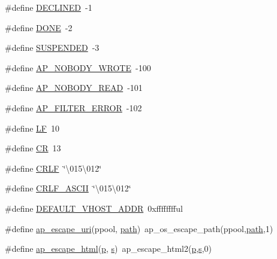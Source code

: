 \begin{DoxyCompactItemize}
\item 
\#define \hyperlink{group__APACHE__CORE__DAEMON_ga9eba11ca86461a3ae319311d64682dda}{D\+E\+C\+L\+I\+N\+ED}~-\/1
\item 
\#define \hyperlink{group__APACHE__CORE__DAEMON_gabe6b865c045f3e7c6892ef4f15ff5779}{D\+O\+NE}~-\/2
\item 
\#define \hyperlink{group__APACHE__CORE__DAEMON_gaeb2de2a76ea6728368042cf7a3fcd60c}{S\+U\+S\+P\+E\+N\+D\+ED}~-\/3
\item 
\#define \hyperlink{group__APACHE__CORE__DAEMON_gab6541339293a2dc16d92208f9656ba02}{A\+P\+\_\+\+N\+O\+B\+O\+D\+Y\+\_\+\+W\+R\+O\+TE}~-\/100
\item 
\#define \hyperlink{group__APACHE__CORE__DAEMON_gafafcc328b1e4659b888a331e302c7d43}{A\+P\+\_\+\+N\+O\+B\+O\+D\+Y\+\_\+\+R\+E\+AD}~-\/101
\item 
\#define \hyperlink{group__APACHE__CORE__DAEMON_ga571664f1af74affc2b898a892f335b82}{A\+P\+\_\+\+F\+I\+L\+T\+E\+R\+\_\+\+E\+R\+R\+OR}~-\/102
\item 
\#define \hyperlink{group__APACHE__CORE__DAEMON_gacdd2e847ca4860289abebda77d2b3c19}{LF}~10
\item 
\#define \hyperlink{group__APACHE__CORE__DAEMON_gac7dc463c440edc9cf8f6a1e316e0b55b}{CR}~13
\item 
\#define \hyperlink{group__APACHE__CORE__DAEMON_ga596f22107770abbd60ffce8338be9732}{C\+R\+LF}~\char`\"{}\textbackslash{}015\textbackslash{}012\char`\"{}
\item 
\#define \hyperlink{group__APACHE__CORE__DAEMON_ga27f3d44ac7137b1b7618bb122c125d75}{C\+R\+L\+F\+\_\+\+A\+S\+C\+II}~\char`\"{}\textbackslash{}015\textbackslash{}012\char`\"{}
\item 
\#define \hyperlink{group__APACHE__CORE__DAEMON_ga4a85b545afcdbd61558b560155cf164b}{D\+E\+F\+A\+U\+L\+T\+\_\+\+V\+H\+O\+S\+T\+\_\+\+A\+D\+DR}~0xfffffffful
\item 
\#define \hyperlink{group__APACHE__CORE__DAEMON_ga3df7a06ed11838b84264a6759b2c3674}{ap\+\_\+escape\+\_\+uri}(ppool,  \hyperlink{ab_8c_a3b02c6de5c049804444a246f7fdf46b4}{path})~ap\+\_\+os\+\_\+escape\+\_\+path(ppool,\hyperlink{ab_8c_a3b02c6de5c049804444a246f7fdf46b4}{path},1)
\item 
\#define \hyperlink{group__APACHE__CORE__DAEMON_gab9fe0e3639cb178b17970ab79f2eec2f}{ap\+\_\+escape\+\_\+html}(\hyperlink{group__APACHE__CORE__MPM_ga5cd91701e5c167f2b1a38e70ab57817e}{p},  \hyperlink{pcretest_8txt_a062597889ba244b72877454b1d3adecf}{s})~ap\+\_\+escape\+\_\+html2(\hyperlink{group__APACHE__CORE__MPM_ga5cd91701e5c167f2b1a38e70ab57817e}{p},\hyperlink{pcretest_8txt_a062597889ba244b72877454b1d3adecf}{s},0)

\end{DoxyCompactItemize}
